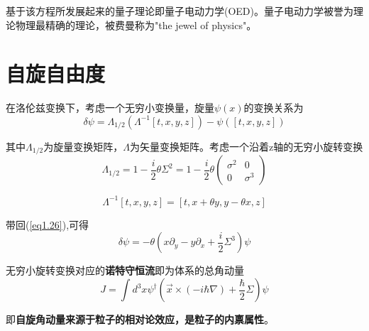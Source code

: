 基于该方程所发展起来的量子理论即量子电动力学(OED)。量子电动力学被誉为理论物理最精确的理论，被费曼称为"the jewel of physics"。

\section{自旋自由度}

在洛伦兹变换下，考虑一个无穷小变换量，旋量$\psi(x)$的变换关系为
\begin{equation}
    \delta\psi=\Lambda_{1/2}(\Lambda^{-1}[t,x,y,z])-\psi([t,x,y,z])
    \label{eq1.26}
\end{equation}

其中$\Lambda_{1/2}$为旋量变换矩阵，$\Lambda$为矢量变换矩阵。考虑一个沿着z轴的无穷小旋转变换
\begin{equation}
    \Lambda_{1/2}=1-\frac{i}{2}\theta\varSigma^2=1-\frac{i}{2}\theta\left(
    \begin{array}{cc}
        \sigma^2 & 0\\
        0        & \sigma^3 
    \end{array}
    \right)
\end{equation}

\begin{equation}
    \Lambda^{-1}[t,x,y,z]=[t,x+\theta y,y-\theta x,z]
\end{equation}

带回(\ref{eq1.26}),可得
\begin{equation}
    \delta\psi=-\theta(x\partial_y-y\partial_x+\frac{i}{2}\varSigma^3)\psi
\end{equation}

无穷小旋转变换对应的\textbf{诺特守恒流}即为体系的总角动量
\begin{equation}
    J=\int d^3x\psi^\dagger (\vec{x}\times (-i\hbar\nabla)+\frac{\hbar}{2}\varSigma)\psi
\end{equation}

即\textbf{自旋角动量来源于粒子的相对论效应，是粒子的内禀属性}。